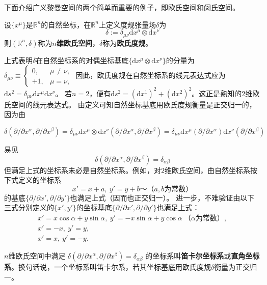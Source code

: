 下面介绍广义黎曼空间的两个简单而重要的例子，即欧氏空间和闵氏空间。

\begin{definition}
设$\{x^\mu\}$是$\mathbb{R}^n$的自然坐标，在$\mathbb{R}^n$上定义度规张量场$\delta$为
$$\delta := \delta_{\mu\nu}\mathrm{d}x^\mu\otimes\mathrm{d}x^\nu$$
则$(\mathbb{R}^n, \delta)$称为\textbf{$n$维欧氏空间}，$\delta$称为\textbf{欧氏度规}。
\end{definition}

上式表明$\delta$在自然坐标系的对偶坐标基底$\{\mathrm{d}x^\mu\otimes\mathrm{d}x^\nu\}$的分量为
$
\delta_{\mu\nu} \equiv
\begin{cases}
0, & \mu \neq \nu, \\
+1, & \mu = \nu,
\end{cases}
$
因此，欧氏度规在自然坐标系的线元表达式应为$\mathrm{d}s^2 = \delta_{\mu\nu}\mathrm{d}x^\mu\mathrm{d}x^\nu$。
若$n = 2$，便有$\mathrm{d}s^2 = (\mathrm{d}x^1)^2 + (\mathrm{d}x^2)^2$。这正是熟知的$2$维欧氏空间的线元表达式。
由定义可知自然坐标基底用欧氏度规衡量是正交归一的，因为由

$\delta(\partial / \partial x^\alpha, \partial / \partial x^\beta) = \delta_{\mu\nu}\mathrm{d}x^\mu\otimes\mathrm{d}x^\nu(\partial / \partial  x^\alpha, \partial / \partial x^\beta) = \delta_{\mu\nu}\mathrm{d}x^\mu(\partial / \partial x^\alpha)\mathrm{d}x^\nu(\partial / \partial x^\beta)$

易见$$\delta(\partial / \partial x^\alpha, \partial / \partial x^\beta) = \delta_{\alpha\beta}$$
但满足上式的坐标系未必是自然坐标系。例如，对$2$维欧氏空间，由自然坐标系按下式定义的坐标系
$$x' = x + a, ~ y' = y +b ～ \text{（$a, b$为常数）}$$
的基底$\{\partial / \partial x', \partial / \partial y'\}$也满足上式（因而也正交归一）。
进一步，不难验证由以下三式分别定义的$\{x', y'\}$的坐标基底$\{\partial / \partial x', \partial / \partial y'\}$也满足上式：
\begin{gather*}
x' = x\cos\alpha + y\sin\alpha, ~ y' = -x\sin\alpha + y\cos\alpha ~ \text{（$\alpha$为常数）}, \\
x' = -x, ~ y' = y, \\
x' = x, ~ y' = -y.
\end{gather*}

\begin{definition}
$n$维欧氏空间中满足
$\delta(\partial / \partial x^\alpha, \partial / \partial x^\beta) = \delta_{\alpha\beta}$
的坐标系叫\textbf{笛卡尔坐标系}或\textbf{直角坐标系}。换句话说，一个坐标系叫笛卡尔系，若其坐标基底用欧氏度规$\delta$衡量为正交归一。
\end{definition}

